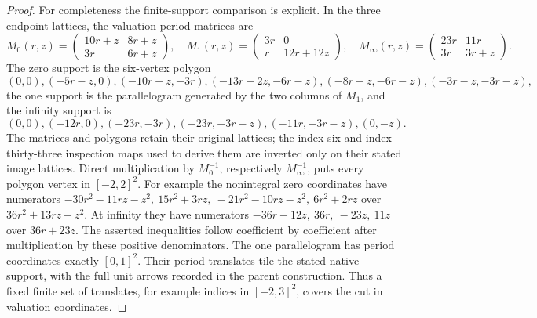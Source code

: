 \begin{proof}
For completeness the finite-support comparison is explicit.
In the three endpoint lattices, the valuation period matrices are
\[
 M_0(r,z)=
 \begin{pmatrix}10r+z&8r+z\\3r&6r+z\end{pmatrix},\quad
 M_1(r,z)=
 \begin{pmatrix}3r&0\\r&12r+12z\end{pmatrix},\quad
 M_\infty(r,z)=
 \begin{pmatrix}23r&11r\\3r&3r+z\end{pmatrix}.
 \tag{ASI2.12}
\]
The zero support is the six-vertex polygon
\[
 (0,0),(-5r-z,0),(-10r-z,-3r),
 (-13r-2z,-6r-z),(-8r-z,-6r-z),(-3r-z,-3r-z),
 \tag{ASI2.13}
\]
the one support is the parallelogram generated by the two columns
of \(M_1\), and the infinity support is
\[
 (0,0),(-12r,0),(-23r,-3r),(-23r,-3r-z),
                         (-11r,-3r-z),(0,-z).
 \tag{ASI2.14}
\]
The matrices and polygons retain their original lattices; the
index-six and index-thirty-three inspection maps used to derive
them are inverted only on their stated image lattices.
Direct multiplication by \(M_0^{-1}\), respectively
\(M_\infty^{-1}\), puts every polygon vertex in \([-2,2]^2\).
For example the nonintegral zero coordinates have numerators
\(-30r^2-11rz-z^2,\ 15r^2+3rz,\ -21r^2-10rz-z^2,\ 6r^2+2rz\)
over \(36r^2+13rz+z^2\). At infinity they have numerators
\(-36r-12z,\ 36r,\ -23z,\ 11z\) over \(36r+23z\).
The asserted inequalities follow coefficient by coefficient
after multiplication by these positive denominators. The one
parallelogram has period coordinates exactly \([0,1]^2\).
Their period translates tile the stated native support, with the
full unit arrows recorded in the parent construction. Thus a
fixed finite set of translates, for example indices in
\([-2,3]^2\), covers the cut in valuation coordinates.


\end{proof}
